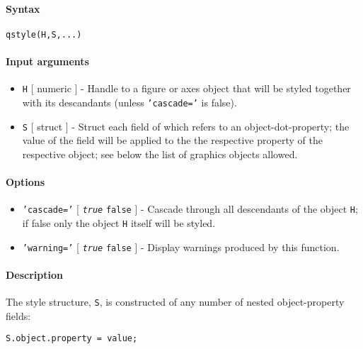 


	\paragraph{Syntax}

\begin{verbatim}
qstyle(H,S,...)
\end{verbatim}

\paragraph{Input arguments}

\begin{itemize}
\item
  \texttt{H} {[} numeric {]} - Handle to a figure or axes object that
  will be styled together with its descandants (unless
  \texttt{'cascade='} is false).
\item
  \texttt{S} {[} struct {]} - Struct each field of which refers to an
  object-dot-property; the value of the field will be applied to the the
  respective property of the respective object; see below the list of
  graphics objects allowed.
\end{itemize}

\paragraph{Options}

\begin{itemize}
\item
  \texttt{'cascade='} {[} \emph{\texttt{true}} \textbar{} \texttt{false}
  {]} - Cascade through all descendants of the object \texttt{H}; if
  false only the object \texttt{H} itself will be styled.
\item
  \texttt{'warning='} {[} \emph{\texttt{true}} \textbar{} \texttt{false}
  {]} - Display warnings produced by this function.
\end{itemize}

\paragraph{Description}

The style structure, \texttt{S}, is constructed of any number of nested
object-property fields:

\begin{verbatim}
S.object.property = value;
\end{verbatim}

